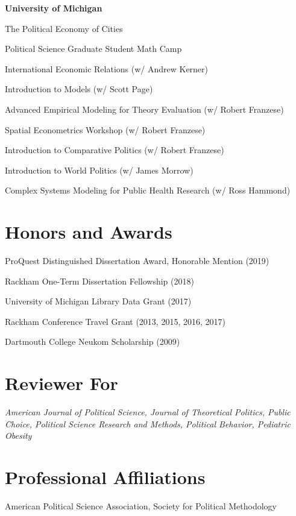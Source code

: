 \documentclass[margin,line]{res}
\newenvironment{list1}{
  \begin{list}{}{%
      \setlength{\itemsep}{0.1in}
      \setlength{\parsep}{0in} \setlength{\parskip}{0in}
      \setlength{\topsep}{0.1in} \setlength{\partopsep}{0in} 
      \setlength{\leftmargin}{0.17in}}}{\end{list}}
\begin{document}
\begin{resume}
\textbf{University of Michigan}
\begin{list1}
	\item[] The Political Economy of Cities
	\item[] Political Science Graduate Student Math Camp
	\item International Economic Relations (w/ Andrew Kerner)
	\item Introduction to Models (w/ Scott Page)
	\item Advanced Empirical Modeling for Theory Evaluation (w/ Robert Franzese)
	\item Spatial Econometrics Workshop (w/ Robert Franzese)
	\item Introduction to Comparative Politics (w/ Robert Franzese)
	\item Introduction to World Politics (w/ James Morrow)
	\item Complex Systems Modeling for Public Health Research (w/ Ross Hammond)
\end{list1}



\section{\sc Honors and Awards} 

ProQuest Distinguished Dissertation Award, Honorable Mention (2019)

Rackham One-Term Dissertation Fellowship (2018)

University of Michigan Library Data Grant (2017)

Rackham Conference Travel Grant (2013, 2015, 2016, 2017)

Dartmouth College Neukom Scholarship (2009)



\section{\sc Reviewer For}
\textit{American Journal of Political Science, Journal of Theoretical Politics, Public Choice, Political Science Research and Methods, Political Behavior, Pediatric Obesity}

\section{\sc Professional Affiliations}
American Political Science Association, Society for Political Methodology






\end{resume}
\end{document}
